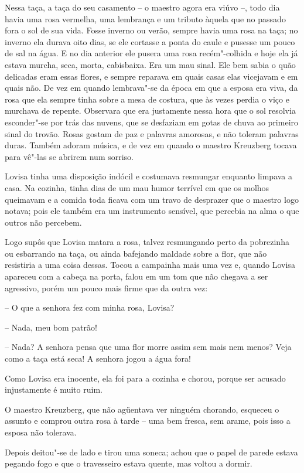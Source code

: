 Nessa taça, a taça do seu casamento -- o maestro agora era viúvo --, todo
dia havia uma rosa vermelha, uma lembrança e um tributo àquela que no
passado fora o sol de sua vida. Fosse inverno ou verão, sempre havia
uma rosa na taça; no inverno ela durava oito dias, se ele cortasse a
ponta do caule e pusesse um pouco de sal na água. E no dia anterior ele
pusera uma rosa recém"-colhida e hoje ela já estava murcha, seca,
morta, cabisbaixa. Era um mau sinal. Ele bem sabia o quão delicadas
eram essas flores, e sempre reparava em quais casas elas vicejavam e em
quais não. De vez em quando lembrava"-se da época em que a esposa era
viva, da rosa que ela sempre tinha sobre a mesa de costura, que às
vezes perdia o viço e murchava de repente. Observara que era justamente
nessa hora que o sol resolvia esconder"-se por trás das nuvens, que
se desfaziam em gotas de chuva ao primeiro sinal do trovão. Rosas gostam de
paz e palavras amorosas, e não toleram palavras duras. Também adoram
música, e de vez em quando o maestro Kreuzberg tocava para vê"-las 
se abrirem num sorriso.

Lovisa tinha uma disposição indócil e costumava resmungar enquanto
limpava a casa. Na cozinha, tinha dias de um mau humor terrível em que
os molhos queimavam e a comida toda ficava com um travo de desprazer
que o maestro logo notava; pois ele também era um instrumento sensível,
que percebia na alma o que outros não percebem.

Logo supôs que Lovisa matara a rosa, talvez resmungando perto da
pobrezinha ou esbarrando na taça, ou ainda bafejando maldade sobre a
flor, que não resistiria a uma coisa dessas. Tocou a campainha mais uma
vez e, quando Lovisa apareceu com a cabeça na porta, falou em um tom
que não chegava a ser agressivo, porém um pouco mais firme que da outra
vez:

-- O que a senhora fez com minha rosa, Lovisa?

-- Nada, meu bom patrão!

-- Nada? A senhora pensa que uma flor morre assim sem mais nem menos?
Veja como a taça está seca! A senhora jogou a água fora!

Como Lovisa era inocente, ela foi para a cozinha e chorou, porque ser
acusado injustamente é muito ruim.

O maestro Kreuzberg, que não agüentava ver ninguém chorando, esqueceu o
assunto e comprou outra rosa à tarde -- uma bem fresca, sem arame, pois
isso a esposa não tolerava. 

Depois deitou"-se de lado e tirou uma soneca; achou que o papel de
parede estava pegando fogo e que o travesseiro estava quente, mas
voltou a dormir. 

